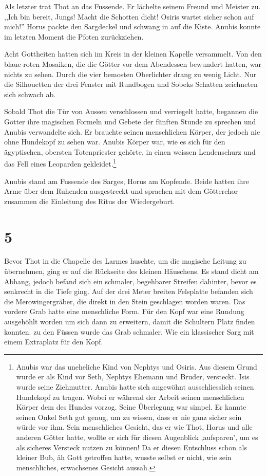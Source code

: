 \documentclass[11pt,titlepage,a5paper]{book}
\begin{document}
Als letzter trat Thot an das Fussende. Er lächelte seinem Freund und Meister zu. ,,Ich bin bereit, Jungs! Macht die Schotten dicht! Osiris wartet sicher schon auf mich!'' Horus packte den Sargdeckel und schwang in auf die Kiste. Anubis konnte im letzten Moment die Pfoten zurückziehen.

Acht Gottheiten hatten sich im Kreis in der kleinen Kapelle versammelt. Von den blaue-roten Mosaiken, die die Götter vor dem Abendessen bewundert hatten, war nichts zu sehen. Durch die vier bemosten Oberlichter drang zu wenig Licht. Nur die Silhouetten der drei Fenster mit Rundbogen und Sobeks Schatten zeichneten sich schwach ab.

Sobald Thot die Tür von Aussen verschlossen und verriegelt hatte, begannen die Götter ihre magischen Formeln und Gebete der fünften Stunde zu sprechen und Anubis verwandelte sich. Er brauchte seinen menschlichen Körper, der jedoch nie ohne Hundekopf zu sehen war. Anubis Körper war, wie es sich für den ägyptischen, obersten Totenpriester gehörte, in einen weissen Lendenschurz und das Fell eines Leoparden gekleidet.\footnote{Anubis war das uneheliche Kind von Nephtys und Osiris. Aus diesem Grund wurde er als Kind vor Seth, Nephtys Ehemann und Bruder, versteckt. Isis wurde seine Ziehmutter. Anubis hatte sich angewöhnt ausschliesslich seinen Hundekopf zu tragen. Wobei er während der Arbeit seinen menschlichen Körper dem des Hundes vorzog. Seine Überlegung war simpel. Er kannte seinen Onkel Seth gut genug, um zu wissen, dass er nie ganz sicher sein würde vor ihm. Sein menschliches Gesicht, das er wie Thot, Horus und alle anderen Götter hatte, wollte er sich für diesen Augenblick ,aufsparen', um es als sicheres Versteck nutzen zu können! Da er diesen Entschluss schon als kleiner Bub, äh Gott getroffen hatte, wusste selbst er nicht, wie sein menschliches, erwachsenes Gesicht aussah.}

Anubis stand am Fussende des Sarges, Horus am Kopfende. Beide hatten ihre Arme über dem Ruhenden ausgestreckt und sprachen mit dem Götterchor zusammen die Einleitung des Ritus der Wiedergeburt.


\section*{5}

Bevor Thot in die Chapelle des Larmes huschte, um die magische Leitung zu übernehmen, ging er auf die Rückseite des kleinen Häuschens. Es stand dicht am Abhang, jedoch befand sich ein schmaler, begehbarer Streifen dahinter, bevor es senkrecht in die Tiefe ging. Auf der drei Meter breiten Felsplatte befanden sich die Merowingergräber, die direkt in den Stein geschlagen worden waren. Das vordere Grab hatte eine menschliche Form. Für den Kopf war eine Rundung ausgehöhlt worden um sich dann zu erweitern, damit die Schultern Platz finden konnten. zu den Füssen wurde das Grab schmaler. Wie ein klassischer Sarg mit einem Extraplatz für den Kopf.
\end{document}
